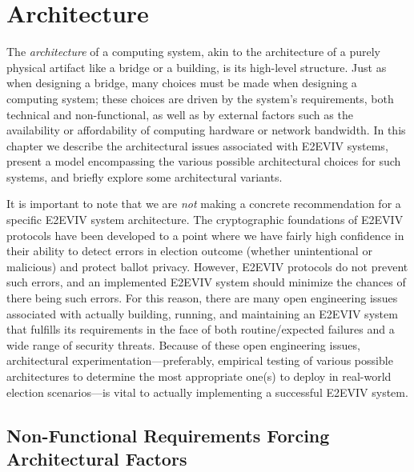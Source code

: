 \chapter{Architecture}
\label{chapter:architecture}

The \emph{architecture} of a computing system, akin to the
architecture of a purely physical artifact like a bridge or a
building, is its high-level structure. Just as when designing a
bridge, many choices must be made when designing a computing system;
these choices are driven by the system's requirements, both technical
and non-functional, as well as by external factors such as the
availability or affordability of computing hardware or network
bandwidth. In this chapter we describe the architectural issues
associated with E2EVIV systems, present a model encompassing the
various possible architectural choices for such systems, and briefly
explore some architectural variants.

It is important to note that we are \emph{not} making a concrete
recommendation for a specific E2EVIV system architecture. The
cryptographic foundations of E2EVIV protocols have been developed to a
point where we have fairly high confidence in their ability to
detect errors in election outcome (whether unintentional or malicious) and protect ballot privacy. 
However, E2EVIV protocols do not prevent such errors, and an implemented E2EVIV system should minimize the chances of there being such errors. For this reason, there are many open engineering issues associated
with actually building, running, and maintaining an E2EVIV system that
fulfills its requirements in the face of both routine/expected
failures and a wide range of security threats. Because of these open
engineering issues, architectural experimentation---preferably,
empirical testing of various possible architectures to determine the
most appropriate one(s) to deploy in real-world election
scenarios---is vital to actually implementing a successful E2EVIV
system. 

\section{Non-Functional Requirements Forcing Architectural Factors}

